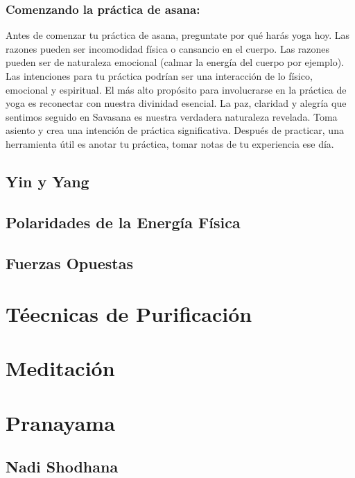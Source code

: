 \subsubsection{Comenzando la práctica de asana:}
Antes de comenzar tu práctica de asana, preguntate por qué harás yoga hoy. Las razones pueden ser incomodidad física o cansancio en el cuerpo. Las razones pueden ser de naturaleza emocional (calmar la energía del cuerpo por ejemplo). Las intenciones para tu práctica podrían ser una interacción de lo físico, emocional y espiritual. El más alto propósito para involucrarse en la práctica de yoga es reconectar con nuestra divinidad esencial. La paz, claridad y alegría que sentimos seguido en Savasana es nuestra verdadera naturaleza revelada. Toma asiento y crea una intención de práctica significativa. Después de practicar, una herramienta útil es anotar tu práctica, tomar notas de tu experiencia ese día.

\subsection{Yin y Yang}
\subsection{Polaridades de la Energía Física}
\subsection{Fuerzas Opuestas}
\section{Téecnicas de Purificación}
\section{Meditación}
\section{Pranayama}
\subsection{Nadi Shodhana}
